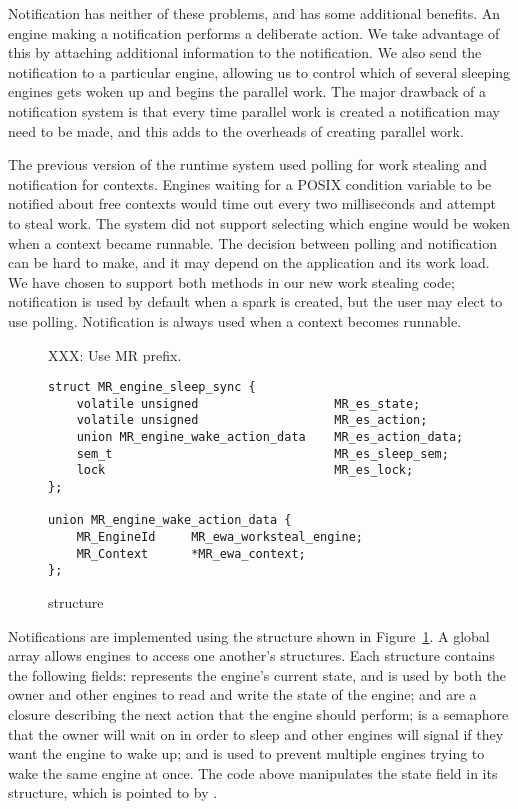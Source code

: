 Notification has neither of these problems, and has some additional
benefits.
An engine making a notification performs a deliberate action.
We take advantage of this by attaching additional information to the
notification.
We also send the notification to a particular engine,
allowing us to control which of several sleeping engines gets woken up and
begins the parallel work.
The major drawback of a notification system is that every time parallel work
is created a notification may need to be made,
and this adds to the overheads of creating parallel work.

The previous version of the runtime system used polling for work
stealing and notification for contexts.
Engines waiting for a POSIX condition variable to be notified about free
contexts would time out every two milliseconds and attempt to steal work.
The system did not support selecting which engine would be woken when a
context became runnable.
The decision between polling and notification can be hard to make,
and it may depend on the application and its work load.
We have chosen to support both methods in our new work stealing code;
notification is used by default when a spark is created,
but the user may elect to use polling.
Notification is always used when a context becomes runnable.

\begin{figure}
XXX: Use MR prefix.
\begin{verbatim}
struct MR_engine_sleep_sync {
    volatile unsigned                   MR_es_state;
    volatile unsigned                   MR_es_action;
    union MR_engine_wake_action_data    MR_es_action_data;
    sem_t                               MR_es_sleep_sem;
    lock                                MR_es_lock;
};

union MR_engine_wake_action_data {
    MR_EngineId     MR_ewa_worksteal_engine;
    MR_Context      *MR_ewa_context;
};
\end{verbatim}
\caption{\enginesleepsync structure}
\label{fig:engine_sleep_sync}
\end{figure}

Notifications are implemented using the \enginesleepsync structure shown in
Figure~\ref{fig:engine_sleep_sync}.
A global array allows engines to access one another's \enginesleepsync
structures.
Each structure contains the following fields:
 represents the engine's current state,
and is used by both the owner and other engines to read and write the state
of the engine;
 and  are a closure describing
the next action that the engine should perform;
 is a semaphore that the owner will wait on in order to
sleep and other engines will signal if they want the engine to wake up;
and  is used to prevent multiple engines trying to wake the same
engine at once.
The \idle code above manipulates the state field in its structure,
which is pointed to by .

